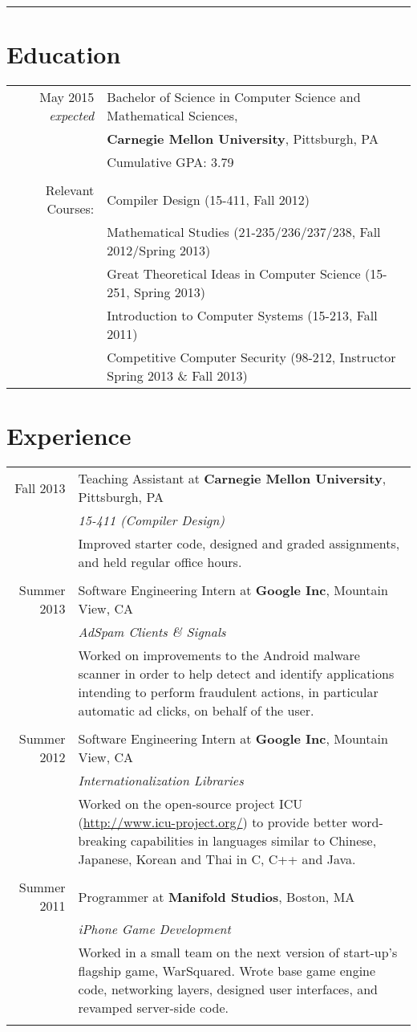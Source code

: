 \documentclass{article}
\newcommand{\job}[6]{#1 & #2 at \textbf{#3}, #4\\ & \emph{#5}\\& \small{#6}\\
    \multicolumn{2}{c}{}\\ }
\begin{document}
\pagestyle{empty}
\par{\bigskip\par}
\hrule
\par{\par}

\section{Education}
\begin{tabular}{rl}
May 2015 {\em expected} & Bachelor of Science in Computer Science and Mathematical Sciences, 
\\ & \textbf{Carnegie Mellon University}, Pittsburgh, PA\\
& Cumulative GPA: 3.79 \\ &\\
Relevant Courses: & Compiler Design (15-411, Fall 2012) \\
& Mathematical Studies (21-235/236/237/238, Fall 2012/Spring 2013) \\
& Great Theoretical Ideas in Computer Science (15-251, Spring 2013) \\
& Introduction to Computer Systems (15-213, Fall 2011) \\
& Competitive Computer Security (98-212, Instructor Spring 2013 \& Fall 2013)\end{tabular}

\section{Experience}
\begin{tabular}{r|p{}}
\job{Fall 2013}{Teaching Assistant}{Carnegie Mellon University}{Pittsburgh, PA}
{15-411 (Compiler Design)}
{Improved starter code, designed and graded assignments,
and held regular office hours.}
\job{Summer 2013}{Software Engineering Intern}{Google Inc}{Mountain View, CA}
{AdSpam Clients \& Signals}
{Worked on improvements to the Android malware scanner in order to help detect and identify
applications intending to perform fraudulent actions, in particular automatic ad clicks, on behalf
of the user.}
\job{Summer 2012}{Software Engineering Intern}{Google Inc}{Mountain View, CA}
{Internationalization Libraries}
{Worked on the open-source project ICU (\url{http://www.icu-project.org/}) to provide better
word-breaking capabilities in languages similar to Chinese, Japanese, Korean and Thai in C, C++ and
Java.}
\job{Summer 2011}{Programmer}{Manifold Studios}{Boston, MA}{iPhone Game Development}
{Worked in a small team on the next version of start-up's flagship game, WarSquared. Wrote base
game engine code, networking layers, designed user interfaces,
and revamped server-side code.}
\end{tabular}
\end{document}
